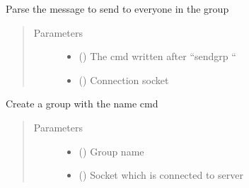 \documentclass[letterpaper,10pt,english]{sphinxmanual}
\begin{document}

\begin{fulllineitems}
\label{\detokenize{userInputHandler:userInputHandler.sendGroupMessage}}
Parse the message to send to everyone in the group
\begin{quote}\begin{description}
\item[{Parameters}] \leavevmode\begin{itemize}
\item {} 
 () \textendash{} The cmd written after “sendgrp “

\item {} 
 () \textendash{} Connection socket

\end{itemize}

\end{description}\end{quote}

\end{fulllineitems}


\begin{fulllineitems}
\label{\detokenize{userInputHandler:userInputHandler.createGroup}}
Create a group with the name cmd
\begin{quote}\begin{description}
\item[{Parameters}] \leavevmode\begin{itemize}
\item {} 
 () \textendash{} Group name

\item {} 
 () \textendash{} Socket which is connected to server

\end{itemize}

\end{description}\end{quote}

\end{fulllineitems}
\end{document}
